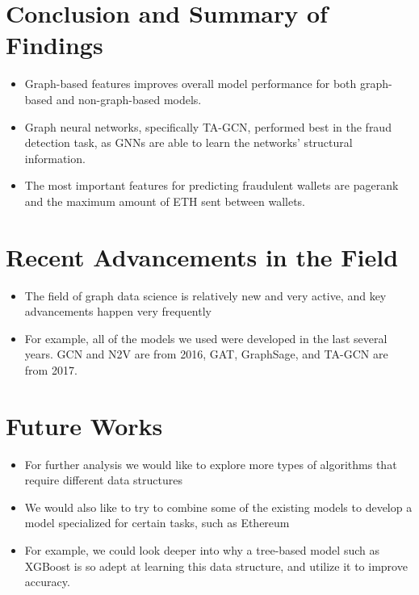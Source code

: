 \documentclass[article,36pt,extrafontsizes,oneside,openany,oldfontcommands]{memoir}
\begin{document}
\begin{adjmulticols*}{3}{0.5in}{0.5in}
\section{Conclusion and Summary of Findings}
\begin{adjustwidth}{0.1in}{0in}
\begin{itemize}[topsep=0pt,itemsep=0ex,partopsep=0ex,parsep=0ex]
\item Graph-based features improves overall model performance for both graph-based and non-graph-based models.
\item Graph neural networks, specifically TA-GCN, performed best in the fraud detection task, as GNNs are able to learn the networks’ structural information.
\item The most important features for predicting  fraudulent wallets are pagerank and the maximum amount of ETH sent between wallets.
\end{itemize} 
\end{adjustwidth}


\section{Recent Advancements in the Field}
\begin{adjustwidth}{0.1in}{0in}
\begin{itemize}[topsep=0pt,itemsep=0ex,partopsep=0ex,parsep=0ex]
\item The field of graph data science is relatively new and very active, and key advancements happen very frequently
\item For example, all of the models we used were developed in the last several years. GCN and N2V are from 2016, GAT, GraphSage, and TA-GCN are from 2017.
\end{itemize} 
\end{adjustwidth}


\section{Future Works}
\begin{adjustwidth}{0.1in}{0in}
\begin{itemize}[topsep=0pt,itemsep=0ex,partopsep=0ex,parsep=0ex]
\item For further analysis we would like to explore more types of algorithms that require different data structures
\item We would also like to try to combine some of the existing models to develop a model specialized for certain tasks, such as Ethereum
\item For example, we could look deeper into why a tree-based model such as XGBoost is so adept at learning this data structure, and utilize it to improve accuracy.
\end{itemize} 
\end{adjustwidth}



\end{adjmulticols*}
\end{document}

